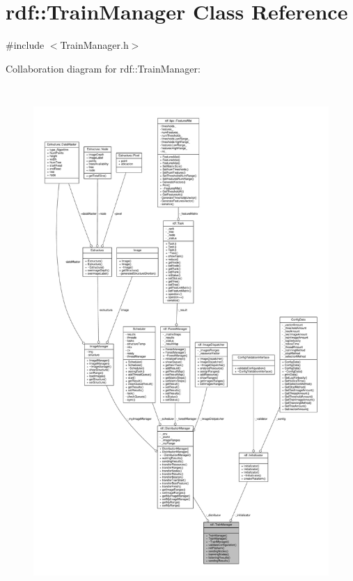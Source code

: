 \hypertarget{classrdf_1_1TrainManager}{}\section{rdf\+:\+:Train\+Manager Class Reference}
\label{classrdf_1_1TrainManager}


{\ttfamily \#include $<$Train\+Manager.\+h$>$}



Collaboration diagram for rdf\+:\+:Train\+Manager\+:
\nopagebreak
\begin{figure}[H]
\begin{center}
\leavevmode
\includegraphics[height=550pt]{classrdf_1_1TrainManager__coll__graph}
\end{center}
\end{figure}
